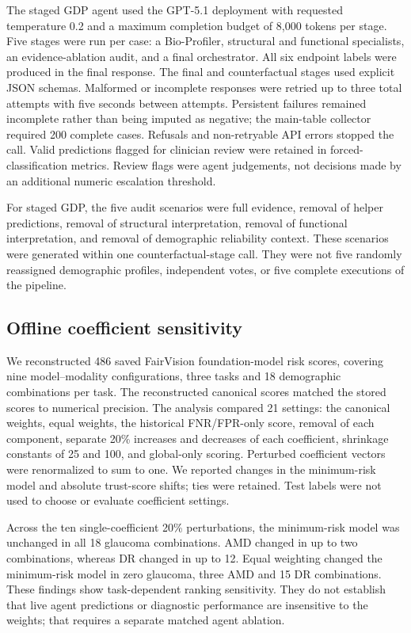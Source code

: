 The staged GDP agent used the GPT-5.1 deployment with requested temperature
0.2 and a maximum completion budget of 8,000 tokens per stage. Five stages
were run per case: a Bio-Profiler, structural and functional specialists, an
evidence-ablation audit, and a final orchestrator. All six endpoint labels
were produced in the final response. The final and counterfactual stages
used explicit JSON schemas. Malformed or incomplete responses were retried
up to three total attempts with five seconds between attempts. Persistent
failures remained incomplete rather than being imputed as negative; the
main-table collector required 200 complete cases. Refusals and non-retryable
API errors stopped the call. Valid predictions flagged for clinician review
were retained in forced-classification metrics. Review flags were agent
judgements, not decisions made by an additional numeric escalation threshold.

For staged GDP, the five audit scenarios were full evidence, removal of
helper predictions, removal of structural interpretation, removal of
functional interpretation, and removal of demographic reliability context.
These scenarios were generated within one counterfactual-stage call. They
were not five randomly reassigned demographic profiles, independent votes,
or five complete executions of the pipeline.

\subsection*{Offline coefficient sensitivity}
We reconstructed 486 saved FairVision foundation-model risk scores, covering
nine model--modality configurations, three tasks and 18 demographic
combinations per task. The reconstructed canonical scores matched the stored
scores to numerical precision. The analysis compared 21 settings: the
canonical weights, equal weights, the historical FNR/FPR-only score, removal
of each component, separate 20\% increases and decreases of each coefficient,
shrinkage constants of 25 and 100, and global-only scoring. Perturbed
coefficient vectors were renormalized to sum to one. We reported changes in
the minimum-risk model and absolute trust-score shifts; ties were retained.
Test labels were not used to choose or evaluate coefficient settings.

Across the ten single-coefficient 20\% perturbations, the minimum-risk model
was unchanged in all 18 glaucoma combinations. AMD changed in up to two
combinations, whereas DR changed in up to 12. Equal weighting changed the
minimum-risk model in zero glaucoma, three AMD and 15 DR combinations. These
findings show task-dependent ranking sensitivity. They do not establish
that live agent predictions or diagnostic performance are insensitive to the
weights; that requires a separate matched agent ablation.

